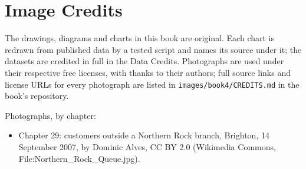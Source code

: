 \chapter*{Image Credits}

The drawings, diagrams and charts in this book are original. Each chart is
redrawn from published data by a tested script and names its source under it;
the datasets are credited in full in the Data Credits.
Photographs are used under their respective free licenses, with thanks to
their authors; full source links and license URLs for every photograph are
listed in \texttt{images/book4/CREDITS.md} in the book's repository.

\bigskip
\noindent Photographs, by chapter:
\begin{itemize}\small
  \item Chapter 29: customers outside a Northern Rock branch, Brighton, 14 September 2007, by Dominic Alves,
    CC BY 2.0 (Wikimedia Commons, File:Northern\_Rock\_Queue.jpg).
\end{itemize}

